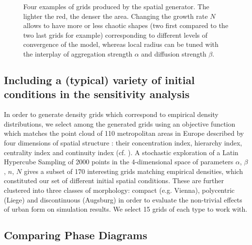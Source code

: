 \documentclass[Afour,sageh,times]{sagej}
\begin{document}
\begin{figure}[htbp] \begin{center} 
 \caption{Four examples of grids produced by the spatial generator. The lighter the red, the denser the area. Changing the growth rate $N$ allows to have more or less chaotic shapes (two first compared to the two last grids for example) corresponding to different levels of convergence of the model, whereas local radius can be tuned with the interplay of aggregation strength $\alpha$ and diffusion strength $\beta$.} \label{fig:spatialGen} \end{center} \end{figure} %


\subsection{Including a (typical) variety of initial conditions in the sensitivity analysis}

In order to generate density grids which correspond to empirical density distributions, we select among the generated grids using an objective function which matches the point cloud of 110 metropolitan areas in Europe described by four dimensions of spatial structure : their concentration index, hierarchy index, centrality index and continuity index (cf. \cite{LeNechet2015}). A stochastic exploration of a Latin Hypercube Sampling of 2000 points in the 4-dimensional space of parameters {$\alpha$, $\beta$, $n$, $N$} gives a subset of 170 interesting grids matching empirical densities, which constituted our set of different initial spatial conditions. These are further clustered into three classes of morphology: compact (e.g. Vienna), polycentric (Liege) and discontinuous (Augsburg) in order to evaluate the non-trivial effects of urban form on simulation results. We select 15 grids of each type to work with.



\subsection{Comparing Phase Diagrams}
\end{document}

